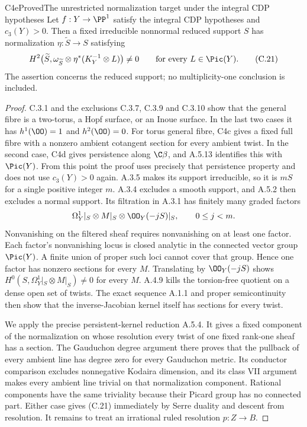 \begin{statement}{C4e}{Proved}{The unrestricted normalization target under the integral CDP hypotheses}
Let $f:Y\to\PP^1$ satisfy the integral CDP hypotheses and $c_3(Y)>0$. Then a fixed irreducible nonnormal reduced support $S$ has normalization $\eta:\widetilde S\to S$ satisfying
\[
 H^2\bigl(\widetilde S,\omega_{\widetilde S}\otimes
           \eta^*(K_Y^{-1}\otimes L)\bigr)\ne0
 \qquad\hbox{for every }L\in\Pic(Y).                  \tag{C.21}
\]
The assertion concerns the reduced support; no multiplicity-one conclusion is included.
\end{statement}
\begin{proof}
C.3.1 and the exclusions C.3.7, C.3.9 and C.3.10 show
that the general fibre is a two-torus, a Hopf surface, or
an Inoue surface. In the last two cases it has
$h^1(\OO)=1$ and $h^2(\OO)=0$.
For torus general fibre, C4c gives a fixed full fibre with a nonzero ambient cotangent section for every ambient twist. In the second case, C4d gives persistence along $\C\beta$, and A.5.13 identifies this with $\Pic(Y)$. From this point the proof uses precisely that persistence property and does not use $c_3(Y)>0$ again. A.3.5 makes its support irreducible, so it is $mS$ for a single positive integer $m$. A.3.4 excludes a smooth support, and A.5.2 then excludes a normal support. Its filtration in A.3.1 has finitely many graded factors
\[
 \Omega_Y^1|_S\otimes M|_S\otimes\OO_Y(-jS)|_S,
 \qquad 0\le j<m.
\]
Nonvanishing on the filtered sheaf requires nonvanishing on at least one factor. Each factor's nonvanishing locus is closed analytic in the connected vector group $\Pic(Y)$. A finite union of proper such loci cannot cover that group. Hence one factor has nonzero sections for every $M$. Translating by $\OO_Y(-jS)$ shows
$H^0(S,\Omega_Y^1|_S\otimes M|_S)\ne0$ for every $M$.
A.4.9 kills the torsion-free quotient on a dense open set of twists. The exact sequence A.1.1 and proper semicontinuity then show that the inverse-Jacobian kernel itself has sections for every twist.

We apply the precise persistent-kernel reduction A.5.4. It gives a fixed component of the normalization on whose resolution every twist of one fixed rank-one sheaf has a section. The Gauduchon degree argument there proves that the pullback of every ambient line has degree zero for every Gauduchon metric. Its conductor comparison excludes nonnegative Kodaira dimension, and its class VII argument makes every ambient line trivial on that normalization component. Rational components have the same triviality because their Picard group has no connected part. Either case gives (C.21) immediately by Serre duality and descent from resolution. It remains to treat an irrational ruled resolution $p:Z\to B$.


\end{proof}
